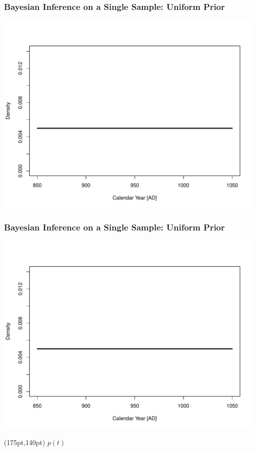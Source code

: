 \documentclass{beamer}
\begin{document}
\begin{frame}[t]
  \frametitle{Bayesian Inference on a Single Sample: Uniform Prior}
    \begin{center}
      \includegraphics[height=.8\textheight]{single_obs_inf_plot1.pdf}
    \end{center}
\end{frame}

\begin{frame}[t]
  \frametitle{Bayesian Inference on a Single Sample: Uniform Prior}
    \begin{center}
      \includegraphics[height=.8\textheight]{single_obs_inf_plot1.pdf}
    \end{center}
    \begin{textblock*}{100pt}(175pt,140pt)
      \Large $p(t)$ \normalsize
	\end{textblock*}
\end{frame}
\end{document}
